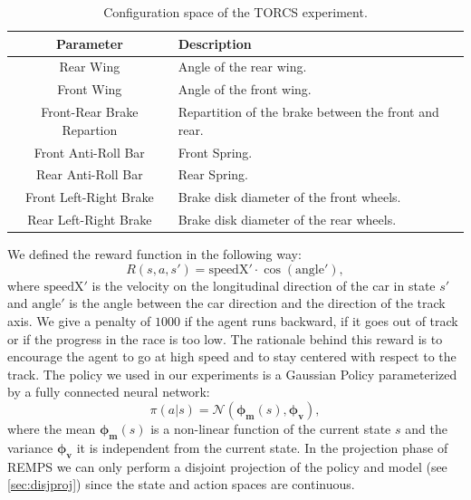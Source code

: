 \begin{table}[tb]
\centering
\begin{tabular}{ c | l }
  \toprule			
  Parameter & Description \\
  \midrule
  Rear Wing & Angle of the rear wing. \\
  Front Wing & Angle of the front wing. \\
 Front-Rear Brake Repartion & Repartition of the brake between the front and rear. \\
   Front Anti-Roll Bar & Front Spring. \\
  Rear Anti-Roll Bar & Rear Spring.\\
  Front Left-Right Brake & Brake disk diameter of the front wheels.\\
  Rear Left-Right Brake & Brake disk diameter of the rear wheels. \\
\bottomrule
\end{tabular}
\caption{Configuration space of the TORCS experiment.} \label{tab:torcs-conf}
\end{table}
We defined the reward function in the following way:
\begin{equation}
	R(s,a,s') = \text{speedX}' \cdot  \cos ( \text{angle}' ),
\end{equation}
where $\text{speedX}'$ is the velocity on the longitudinal direction of the car in state $s'$ and $\text{angle}'$ is the angle between the car direction and the direction of the track axis.  We give a penalty of $1000$ if the agent runs backward, if it goes out of track or if the progress in the race is too low. The rationale behind this reward is to encourage the agent to go at high speed and to stay centered with respect to the track. \newline
The policy we used in our experiments is a Gaussian Policy parameterized by a fully connected neural network:
\begin{equation}
	\pi(a|s) = \mathcal{N}(\boldsymbol{\phi_m}(s), \boldsymbol{\phi_v}),
\end{equation}
where the mean $\boldsymbol{\phi_m}(s)$ is a non-linear function of the current state $s$ and the variance $\boldsymbol{\phi_v}$ it is independent from the current state. \newline
In the projection phase of REMPS we can only perform a disjoint projection of the policy and model (see \cref{sec:disjproj}) since the state and action spaces are continuous.
